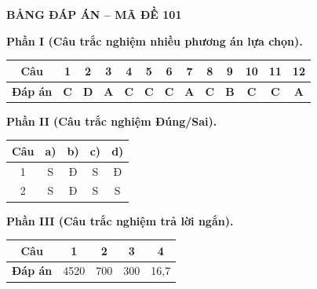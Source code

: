 \vspace{0.4cm}
\noindent\begin{minipage}{\linewidth}
\begin{center}{\large\bfseries\color{red!80!black} BẢNG ĐÁP ÁN -- MÃ ĐỀ 101}\end{center}
\vspace{0.15cm}
\noindent\textbf{Phần I (Câu trắc nghiệm nhiều phương án lựa chọn).}\par\smallskip
\begin{center}
\begin{tabular}{|c|c|c|c|c|c|c|c|c|c|c|c|c|}\hline
\textbf{Câu} & 1 & 2 & 3 & 4 & 5 & 6 & 7 & 8 & 9 & 10 & 11 & 12 \\ \hline
\textbf{Đáp án} & \textbf{C} & \textbf{D} & \textbf{A} & \textbf{C} & \textbf{C} & \textbf{C} & \textbf{A} & \textbf{C} & \textbf{B} & \textbf{C} & \textbf{C} & \textbf{A} \\ \hline
\end{tabular}
\end{center}
\noindent\textbf{Phần II (Câu trắc nghiệm Đúng/Sai).}\par\smallskip
\begin{center}
\begin{tabular}{|c|c|c|c|c|}\hline
\textbf{Câu} & \textbf{a)} & \textbf{b)} & \textbf{c)} & \textbf{d)} \\ \hline
1 & S & Đ & S & Đ \\ \hline
2 & S & Đ & S & S \\ \hline
\end{tabular}
\end{center}
\noindent\textbf{Phần III (Câu trắc nghiệm trả lời ngắn).}\par\smallskip
\begin{center}
\begin{tabular}{|c|c|c|c|c|}\hline
\textbf{Câu} & 1 & 2 & 3 & 4 \\ \hline
\textbf{Đáp án} & 4520 & 700 & 300 & 16,7 \\ \hline
\end{tabular}
\end{center}
\end{minipage}
